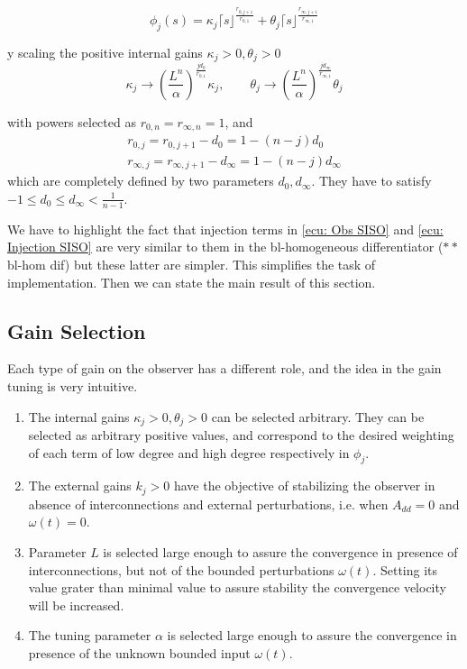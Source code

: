 \documentclass[11pt,letterpaper,twoside,openright]{report}
\newcommand{\sig}[2]{\lceil#1\rfloor^{#2}}
\begin{document}
\begin{equation}\label{ecu: Injection SISO}
	\phi_{j}(s) = \kappa_{ j} \sig{ s }{\frac{r_{0,j+1}}{r_{0,1}}} + \theta_{ j} \sig{ s }{\frac{r_{\infty,j+1}}{r_{\infty,1}}}
\end{equation}

y scaling the positive internal gains $\kappa_{ j}>0,\theta_{ j}>0$
\begin{equation}
	\kappa_{ j} \rightarrow \left( \frac{L^{n}}{\alpha}\right)^{\frac{jd_0}{r_{0,1}}}\kappa_{ j} ,\qquad \theta_{ j} \rightarrow \left( \frac{L^{n}}{\alpha}\right)^{\frac{jd_{\infty}}{r_{\infty,1}}}\theta_{ j}
\end{equation}

with powers selected as $r_{0,n}=r_{\infty,n}=1$, and
\begin{equation}\label{ecu: r-siso}
	\begin{split}
		r_{0,j} = r_{0,j+1}-d_0 = 1-(n-j)d_0 \\
		r_{\infty,j} = r_{\infty,j+1}-d_{\infty} = 1-(n-j)d_{\infty}
	\end{split}
\end{equation}
which are completely defined by two parameters $d_0,d_{\infty}$. They have to satisfy $-1\leq d_0 \leq d_{\infty} < \frac{1}{n-1}$.

We have to highlight the fact that injection terms in \eqref{ecu: Obs SISO} and \eqref{ecu: Injection SISO} are very similar to them in the bl-homogeneous differentiator ($**$bl-hom dif) but these latter are simpler. This simplifies the task of implementation. Then we can state the main result of this section.

\subsection{Gain Selection}
	Each type of gain on the observer has a different role, and the idea in the gain tuning is very intuitive.
	\begin{enumerate}
		\item The internal gains $\kappa_j > 0, \theta_j > 0$ can be selected arbitrary. They can be selected as arbitrary positive values, and correspond to the desired weighting of each term of low degree and high degree respectively in $\phi_j$.
		\item The external gains $k_j > 0$ have the objective of stabilizing the observer in absence of interconnections and external perturbations, i.e. when $A_{dd}=0$ and $\omega(t)=0$.
		\item Parameter $L$ is selected large enough to assure the convergence in presence of interconnections, but not of the bounded
		perturbations $\omega(t)$. Setting its value grater than minimal value to assure stability the convergence velocity will be increased.
		\item The tuning parameter $\alpha$ is selected large enough to assure the convergence in presence of the unknown bounded input $\omega(t)$.
	\end{enumerate}
\end{document}
